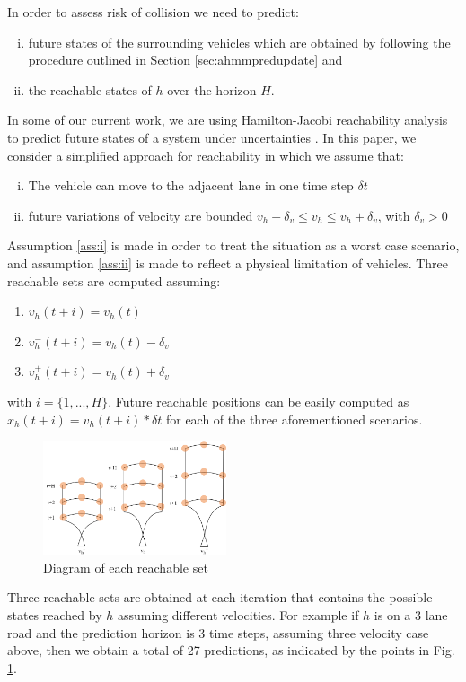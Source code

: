 \documentclass[letterpaper, 10 pt, conference]{ieeeconf}  %
\newcommand\RP[1]{$\clubsuit$\footnote{RP: #1}}
\begin{document}
In order to assess risk of collision we need to predict:
\begin{enumerate}[i.]
\item future states of the surrounding vehicles which are obtained by following the procedure outlined in Section \ref{sec:ahmmpredupdate} and
\item the reachable states of $h$ over the horizon $H$.
\end{enumerate}
In some of our current work, we are using Hamilton-Jacobi reachability analysis to predict future states of a system under uncertainties \cite{esen}. In this paper, we consider a simplified approach for reachability in which we assume that:
\begin{enumerate}[i.]
\item The vehicle can move to the adjacent lane in one time step $\delta t$ \label{ass:i}
\item future variations of velocity are bounded $v_h-\delta_v \leq v_h\leq v_h+\delta_v$, with $\delta_v>0$ \label{ass:ii}
\end{enumerate}
Assumption \ref{ass:i} is made in order to treat the situation as a worst case scenario, and assumption \ref{ass:ii} is made to reflect a physical limitation of vehicles.
Three reachable sets are computed assuming:
\begin{enumerate}
    \item $v_h(t+i)=v_h(t)$
    \item $v_{h}^-(t+i)=v_h(t)-\delta_v$
    \item $v_{h}^+(t+i)=v_h(t)+\delta_v$
\end{enumerate} with $i=\{1,...,H\}$. Future reachable positions can be easily computed as $x_h(t+i)=v_h(t+i)*\delta t$ for each of the three aforementioned scenarios.  

\begin{figure}[ht!]
    \includegraphics[width=0.48\textwidth]{input.png}
    \caption{Diagram of each reachable set}
    \label{fig:reach}
\end{figure}

Three reachable sets are obtained at each iteration that contains the possible states reached by $h$ assuming different velocities. For example if $h$ is on a 3 lane road and the prediction horizon is 3 time steps, assuming three velocity case above, then we obtain a total of 27 predictions, as indicated by the points in Fig. \ref{fig:reach}.
\end{document}
